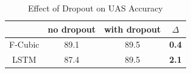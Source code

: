 
\begin{table}[h]
\centering
\begin{tabular}{|c|c|c|c|}
\hline
{\bf } & no dropout & with dropout & {\bf $\Delta$} \\ \hline
F-Cubic    & 89.1        & 89.5        & {\bf 0.4} \\ \hline
LSTM       & 87.4        & 89.5  & {\bf 2.1} \\ \hline
\end{tabular}
\caption{\label{table:with_without_dropout} Effect of Dropout on UAS Accuracy}
\end{table}





